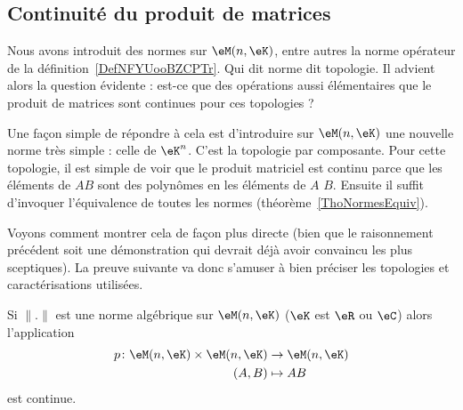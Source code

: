 \subsection{Continuité du produit de matrices}
\label{SUBSECooOAWAooFcyUfI}

Nous avons introduit des normes sur \( \eM(n,\eK)\), entre autres la norme opérateur de la définition~\ref{DefNFYUooBZCPTr}. Qui dit norme dit topologie. Il advient alors la question évidente : est-ce que des opérations aussi élémentaires que le produit de matrices sont continues pour ces topologies ?

Une façon simple de répondre à cela est d'introduire sur \( \eM(n,\eK)\) une nouvelle norme très simple : celle de \( \eK^n\). C'est la topologie par composante. Pour cette topologie, il est simple de voir que le produit matriciel est continu parce que les éléments de \( AB\) sont des polynômes en les éléments de \( A\) \( B\). Ensuite il suffit d'invoquer l'équivalence de toutes les normes (théorème~\ref{ThoNormesEquiv}).

Voyons comment montrer cela de façon plus directe (bien que le raisonnement précédent soit une démonstration qui devrait déjà avoir convaincu les plus sceptiques). La preuve suivante va donc s'amuser à bien préciser les topologies et caractérisations utilisées.

\begin{lemma}       \label{LEMooRGNRooPovBQw}
	Si \( \| . \|\) est une norme algébrique sur \( \eM(n,\eK)\) (\( \eK\) est \( \eR\) ou \( \eC\)) alors l'application
	\begin{equation}
		\begin{aligned}
			p\colon \eM(n,\eK)\times \eM(n,\eK) & \to \eM(n,\eK) \\
			(A,B)                               & \mapsto AB
		\end{aligned}
	\end{equation}
	est continue.
\end{lemma}

